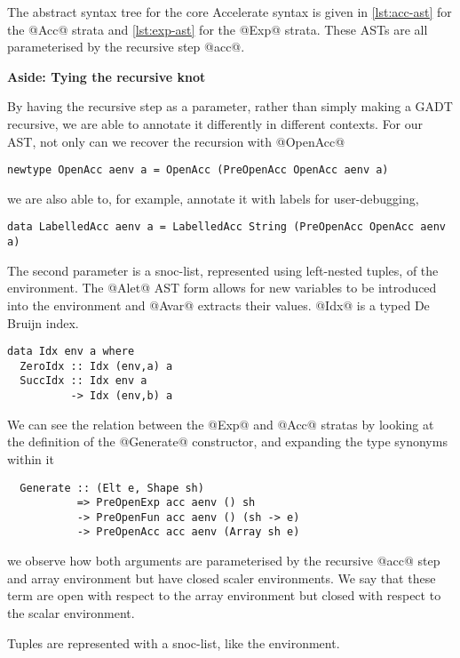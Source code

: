 The abstract syntax tree for the core Accelerate syntax is given in \ref{lst:acc-ast} for the @Acc@ strata and \ref{lst:exp-ast} for the @Exp@ strata. These ASTs are all parameterised by the recursive step @acc@.

\begin{aside}
\begin{center}
\textbf{Aside: Tying the recursive knot}
\end{center}

By having the recursive step as a parameter, rather than simply making a GADT recursive, we are able to annotate it differently in different contexts. For our AST, not only can we recover the recursion with @OpenAcc@
%
\begin{lstlisting}
newtype OpenAcc aenv a = OpenAcc (PreOpenAcc OpenAcc aenv a)
\end{lstlisting}
%
we are also able to, for example, annotate it with labels for user-debugging,
%
\begin{lstlisting}
data LabelledAcc aenv a = LabelledAcc String (PreOpenAcc OpenAcc aenv a)
\end{lstlisting}
\end{aside}

The second parameter is a snoc-list, represented using left-nested tuples, of the environment. The @Alet@ AST form allows for new variables to be introduced into the environment and @Avar@ extracts their values. @Idx@ is a typed De Bruijn index.
%
\begin{lstlisting}
data Idx env a where
  ZeroIdx :: Idx (env,a) a
  SuccIdx :: Idx env a
          -> Idx (env,b) a
\end{lstlisting}
%

We can see the relation between the @Exp@ and @Acc@ stratas by looking at the definition of the @Generate@ constructor, and expanding the type synonyms within it
%
\begin{lstlisting}
  Generate :: (Elt e, Shape sh)
           => PreOpenExp acc aenv () sh
           -> PreOpenFun acc aenv () (sh -> e)
           -> PreOpenAcc acc aenv (Array sh e)
\end{lstlisting}
%
we observe how both arguments are parameterised by the recursive @acc@ step and array environment but have closed scaler environments. We say that these term are open with respect to the array environment but closed with respect to the scalar environment.

Tuples are represented with a snoc-list, like the environment.

